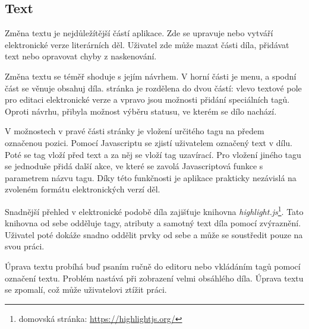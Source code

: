         \subsection{Text}
            Změna textu je nejdůležítější částí aplikace. Zde se upravuje nebo vytváří elektronické verze literárních děl. Uživatel zde může mazat části díla, přidávat text nebo opravovat chyby z naskenování.
            
            Změna textu se téměř shoduje s jejím návrhem. V horní části je menu, a spodní část se věnuje obsahuj díla. stránka je rozdělena do dvou částí: vlevo textové pole pro editaci elektronické verze a vpravo jsou možnosti přidání speciálních tagů. Oproti návrhu, přibyla možnost výběru statusu, ve kterém se dílo nachází.
            
            V možnostech v pravé části stránky je vložení určitého tagu na předem označenou pozici. Pomocí Javascriptu se zjistí uživatelem označený text v dílu. Poté se tag vloží před text a za něj se vloží tag uzavírací. Pro vložení jiného tagu se jednoduše přidá další akce, ve které se zavolá Javascriptová funkce s parametrem názvu tagu. Díky této funkčnosti je aplikace prakticky nezávislá na zvoleném formátu elektronických verzí děl.
            
            Snadnější přehled v elektronické podobě díla zajišťuje knihovna \textit{highlight.js}\footnote{domovská stránka: \url{https://highlightjs.org/}}. Tato knihovna od sebe odděluje tagy, atributy a samotný text díla pomocí zvýraznění. Uživatel poté dokáže snadno oddělit prvky od sebe a může se soustředit pouze na svou práci.
            
            Úprava textu probíhá buď psaním ručně do editoru nebo vkládáním tagů pomocí označení textu. Problém nastává při zobrazení velmi obsáhlého díla. Úprava textu se zpomalí, což může uživatelovi ztížit práci.
